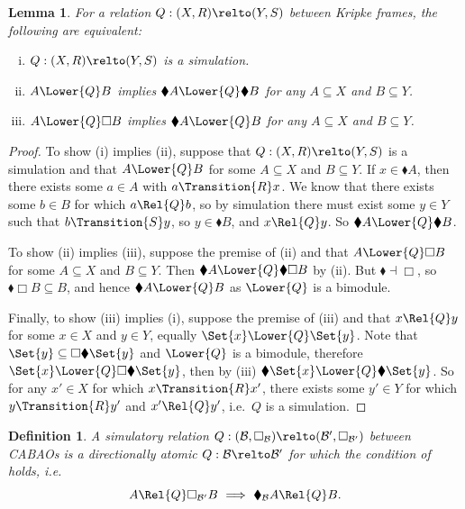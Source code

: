 \documentclass[10pt,a4paper]{article}
\newtheorem{lemma}[theorem]{Lemma}
\newtheorem{definition}[theorem]{Definition}
\begin{document}
\begin{lemma}\label{lemma:sim-black}\label{lemma:simulatory}
  For a relation \(Q : (X, R) \relto (Y, S)\) between Kripke frames,
  the following are equivalent:
  \begin{enumerate}[(i)]
  \item \(Q : (X, R) \relto (Y, S)\) is a simulation.
  \item \(A \Lower{Q} B\) implies
    \(\blacklozenge A \Lower{Q} \blacklozenge B\) for any
    \(A \subseteq X\) and \(B \subseteq Y\).
  \item \(A \Lower{Q} \Box B\) implies \(\blacklozenge A \Lower{Q} B\)
    for any \(A \subseteq X\) and \(B \subseteq Y\).
  \end{enumerate}
\end{lemma}
\begin{proof}
  To show (i) implies (ii), suppose that \(Q : (X, R) \relto (Y, S)\)
  is a simulation and that \(A \Lower{Q} B\) for some
  \(A \subseteq X\) and \(B \subseteq Y\). If
  \(x \in \blacklozenge A\), then there exists some \(a \in A\) with
  \(a \Transition{R} x\). We know that there exists some \(b \in B\)
  for which \(a \Rel{Q} b\), so by simulation there must exist some
  \(y \in Y\) such that \(b \Transition{S} y\), so
  \(y \in \blacklozenge B\), and \(x \Rel{Q} y\). So
  \(\blacklozenge A \Lower{Q} \blacklozenge B\).

  To show (ii) implies (iii), suppose the premise of (ii) and that
  \(A \Lower{Q} \Box B\) for some \(A \subseteq X\) and
  \(B \subseteq Y\).  Then
  \(\blacklozenge A \Lower{Q} \blacklozenge \Box B\) by (ii). But
  \(\blacklozenge \dashv \Box\), so
  \(\blacklozenge \Box B \subseteq B\), and hence
  \(\blacklozenge A \Lower{Q} B\) as \(\Lower{Q}\) is a bimodule.

  Finally, to show (iii) implies (i), suppose the premise of (iii) and
  that \(x \Rel{Q} y\) for some \(x \in X\) and \(y \in Y\), equally
  \(\Set{x} \Lower{Q} \Set{y}\). Note that
  \(\Set{y} \subseteq \Box \blacklozenge \Set{y}\) and \(\Lower{Q}\)
  is a bimodule, therefore
  \(\Set{x} \Lower{Q} \Box \blacklozenge \Set{y}\), then by (iii)
  \(\blacklozenge \Set{x} \Lower{Q} \blacklozenge \Set{y}\).  So for
  any \(x' \in X\) for which \(x \Transition{R} x'\), there exists
  some \(y' \in Y\) for which \(y \Transition{R} y'\) and
  \(x' \Rel{Q} y'\), i.e.\ \(Q\) is a simulation.
\end{proof}

\begin{definition}
  A \emph{simulatory relation}
  \(Q : (\mathcal{B}, \Box_\mathcal{B}) \relto (\mathcal{B}',
  \Box_{\mathcal{B}'})\) between CABAOs is a directionally atomic
  \(Q : \mathcal{B} \relto \mathcal{B}'\) for which the condition of
   holds, i.e.\
  \[
    A \Rel{Q} \Box_{\mathcal{B}'} B\
    \Longrightarrow\
    \blacklozenge_\mathcal{B} A \Rel{Q} B.
  \]
\end{definition}
\end{document}
